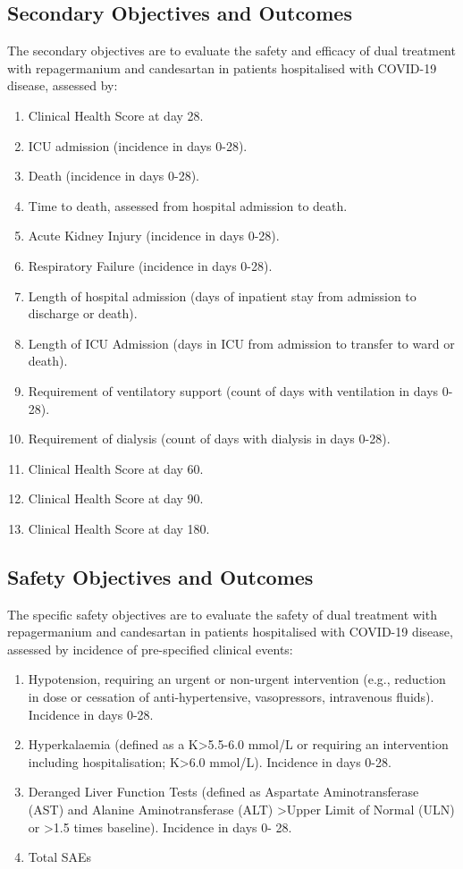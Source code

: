 \documentclass[11pt,parskip=half-]{scrartcl}
\begin{document}
\subsection{Secondary Objectives and Outcomes}
The secondary objectives are to evaluate the safety and efficacy of dual treatment with repagermanium and candesartan in patients hospitalised with COVID-19 disease, assessed by:
\begin{enumerate}
    \item Clinical Health Score at day 28.
    \item ICU admission (incidence in days 0-28).
    \item Death (incidence in days 0-28).
    \item Time to death, assessed from hospital admission to death.
    \item Acute Kidney Injury (incidence in days 0-28).
    \item Respiratory Failure (incidence in days 0-28).
    \item Length of hospital admission (days of inpatient stay from admission to discharge or death).
    \item Length of ICU Admission (days in ICU from admission to transfer to ward or death).
    \item Requirement of ventilatory support (count of days with ventilation in days 0-28).
    \item Requirement of dialysis (count of days with dialysis in days 0-28).
    \item Clinical Health Score at day 60.
    \item Clinical Health Score at day 90.
    \item Clinical Health Score at day 180.
\end{enumerate}

\subsection{Safety Objectives and Outcomes}
The specific safety objectives are to evaluate the safety of dual treatment with repagermanium and candesartan in patients hospitalised with COVID-19 disease, assessed by incidence of pre-specified clinical events:

\begin{enumerate}[resume]
    \item Hypotension, requiring an urgent or non-urgent intervention (e.g., reduction in dose or cessation of anti-hypertensive, vasopressors, intravenous fluids). Incidence in days 0-28.
    \item  Hyperkalaemia (defined as a K>5.5-6.0 mmol/L or requiring an intervention including hospitalisation; K>6.0 mmol/L). Incidence in days 0-28.
    \item Deranged Liver Function Tests (defined as Aspartate Aminotransferase (AST) and Alanine Aminotransferase (ALT) >Upper Limit of Normal (ULN) or >1.5 times baseline). Incidence in days 0- 28.
    \item Total SAEs
\end{enumerate}
\end{document}
